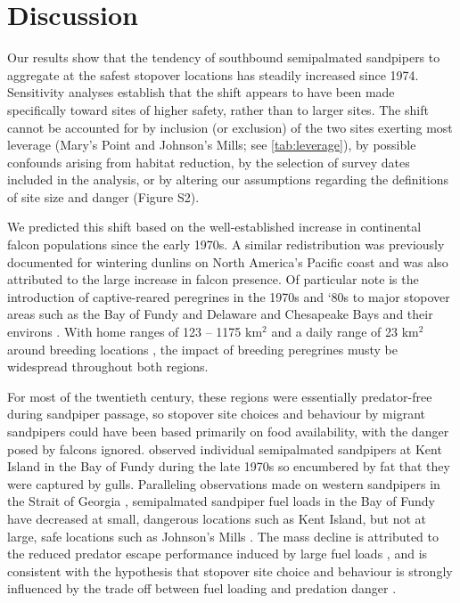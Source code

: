 \section{Discussion}

Our results show that the tendency of southbound semipalmated sandpipers to aggregate at the safest stopover locations has steadily increased since 1974. Sensitivity analyses establish that the shift appears to have been made specifically toward sites of higher safety, rather than to larger sites. The shift cannot be accounted for by inclusion (or exclusion) of the two sites exerting most leverage (Mary's Point and Johnson's Mills; see \autoref{tab:leverage}), by possible confounds arising from habitat reduction, by the selection of survey dates included in the analysis, or by altering our assumptions regarding the definitions of site size and danger (Figure S2).

We predicted this shift based on the well-established increase in continental falcon populations since the early 1970s. A similar redistribution was previously documented for wintering dunlins on North America’s Pacific coast \citep{Ydenberg2017} and was also attributed to the large increase in falcon presence. Of particular note is the introduction of captive-reared peregrines in the 1970s and ‘80s to major stopover areas such as the Bay of Fundy \citep{Dekker2011} and Delaware and Chesapeake Bays and their environs \citep{Watts2015}. With home ranges of 123 -- 1175 km$^2$ and a daily range of 23 km$^2$ around breeding locations \citep{Enderson1997a,Jenkins1998,Ganusevich2004}, the impact of breeding peregrines musty be widespread throughout both regions.

For most of the twentieth century, these regions were essentially predator-free during sandpiper passage, so stopover site choices and behaviour by migrant sandpipers could have been based primarily on food availability, with the danger posed by falcons ignored. \citet{Lank1983} observed individual semipalmated sandpipers at Kent Island in the Bay of Fundy during the late 1970s so encumbered by fat that they were captured by gulls. Paralleling observations made on western sandpipers in the Strait of Georgia \citep{ydenberg_western_2004}, semipalmated sandpiper fuel loads in the Bay of Fundy have decreased at small, dangerous locations such as Kent Island, but not at large, safe locations such as Johnson's Mills \citep{hope2010influence}. The mass decline is attributed to the reduced predator escape performance induced by large fuel loads \citep{burns_effects_2002}, and is consistent with the hypothesis that stopover site choice and behaviour is strongly influenced by the trade off between fuel loading and predation danger \citep{Pomeroy2008a,Taylor2007}.  

